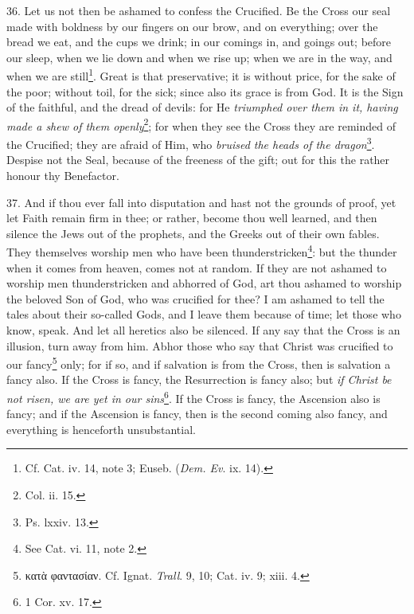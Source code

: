 36. Let us not then be ashamed to confess the Crucified. Be the Cross our seal made with boldness by our fingers on our brow, and on everything; over the bread we eat, and the cups we drink; in our comings in, and goings out; before our sleep, when we lie down and when we rise up; when we are in the way, and when we are still\footnote{Cf. Cat. iv. 14, note 3; Euseb. (\emph{Dem. Ev}. ix. 14).}. Great is that preservative; it is without price, for the sake of the poor; without toil, for the sick; since also its grace is from God. It is the Sign of the faithful, and the dread of devils: for He \emph{triumphed over them in it, having made a shew of them openly}\footnote{Col. ii. 15.}; for when they see the Cross they are reminded of the Crucified; they are afraid of Him, who \emph{bruised the heads of the dragon}\footnote{Ps. lxxiv. 13.}. Despise not the Seal, because of the freeness of the gift; out for this the rather honour thy Benefactor.

37. And if thou ever fall into disputation and hast not the grounds of proof, yet let Faith remain firm in thee; or rather, become thou well learned, and then silence the Jews out of the prophets, and the Greeks out of their own fables. They themselves worship men who have been thunderstricken\footnote{See Cat. vi. 11, note 2.}: but the thunder when it comes from heaven, comes not at random. If they are not ashamed to worship men thunderstricken and abhorred of God, art thou ashamed to worship the beloved Son of God, who was crucified for thee? I am ashamed to tell the tales about their so-called Gods, and I leave them because of time; let those who know, speak. And let all heretics also be silenced. If any say that the Cross is an illusion, turn away from him. Abhor those who say that Christ was crucified to our fancy\footnote{\textgreek{κατὰ φαντασίαν}. Cf. Ignat. \emph{Trall}. 9, 10; Cat. iv. 9; xiii. 4.} only; for if so, and if salvation is from the Cross, then is salvation a fancy also. If the Cross is fancy, the Resurrection is fancy also; but \emph{if Christ be not risen, we are yet in our sins}\footnote{1 Cor. xv. 17.}. If the Cross is fancy, the Ascension also is fancy; and if the Ascension is fancy, then is the second coming also fancy, and everything is henceforth unsubstantial.

